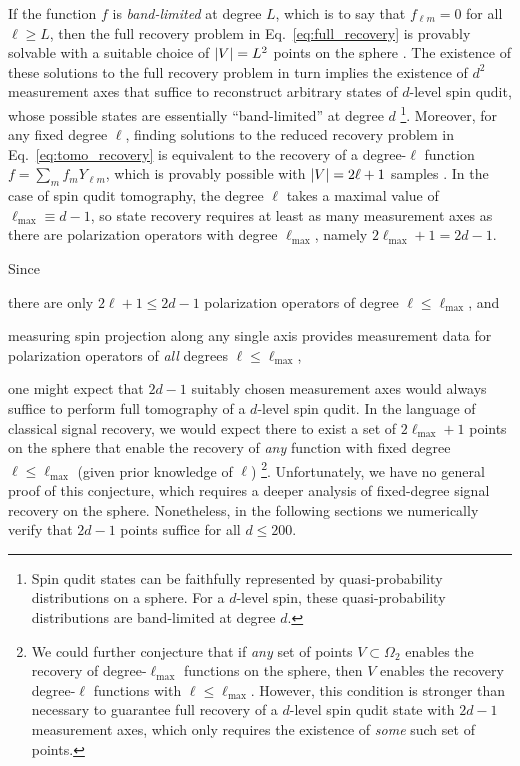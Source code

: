\documentclass[notitlepage,twocolumn]{revtex4-2}
\renewcommand{\t}{\text} %
\begin{document}
If the function $f$ is {\it band-limited} at degree $L$, which is to say that $f_{\ell m}=0$ for all $\ell\ge L$, then the full recovery problem in Eq.~\eqref{eq:full_recovery} is provably solvable with a suitable choice of $\abs{V}=L^2$ points on the sphere \cite{freeden2008spherical, freeden2018spherical}.
The existence of these solutions to the full recovery problem in turn implies the existence of $d^2$ measurement axes that suffice to reconstruct arbitrary states of $d$-level spin qudit, whose possible states are essentially ``band-limited'' at degree $d$ \footnote{Spin qudit states can be faithfully represented by quasi-probability distributions on a sphere.  For a $d$-level spin, these quasi-probability distributions are band-limited at degree $d$.}.
Moreover, for any fixed degree $\ell$, finding solutions to the reduced recovery problem in Eq.~\eqref{eq:tomo_recovery} is equivalent to the recovery of a degree-$\ell$ function $f = \sum_m f_m Y_{\ell m}$, which is provably possible with $\abs{V}=2\ell+1$ samples \cite{freeden2008spherical}.
In the case of spin qudit tomography, the degree $\ell$ takes a maximal value of $\ell_{\t{max}}\equiv d-1$, so state recovery requires at least as many measurement axes as there are polarization operators with degree $\ell_{\t{max}}$, namely $2\ell_{\t{max}}+1=2d-1$.

Since
\begin{enumerate*}
\item there are only $2\ell+1\le2d-1$ polarization operators of degree $\ell\le\ell_{\t{max}}$, and
\item measuring spin projection along any single axis provides measurement data for polarization operators of {\it all} degrees $\ell\le\ell_{\t{max}}$,
\end{enumerate*}
one might expect that $2d-1$ suitably chosen measurement axes would always suffice to perform full tomography of a $d$-level spin qudit.
In the language of classical signal recovery, we would expect there to exist a set of $2\ell_{\t{max}}+1$ points on the sphere that enable the recovery of {\it any} function with fixed degree $\ell\le\ell_{\t{max}}$ (given prior knowledge of $\ell$) \footnote{We could further conjecture that if {\it any} set of points $V\subset\Omega_2$ enables the recovery of degree-$\ell_{\t{max}}$ functions on the sphere, then $V$ enables the recovery degree-$\ell$ functions with $\ell\le\ell_{\t{max}}$.
  However, this condition is stronger than necessary to guarantee full recovery of a $d$-level spin qudit state with $2d-1$ measurement axes, which only requires the existence of {\it some} such set of points.}.
Unfortunately, we have no general proof of this conjecture, which requires a deeper analysis of fixed-degree signal recovery on the sphere.
Nonetheless, in the following sections we numerically verify that $2d-1$ points suffice for all $d\le200$.
\end{document}
